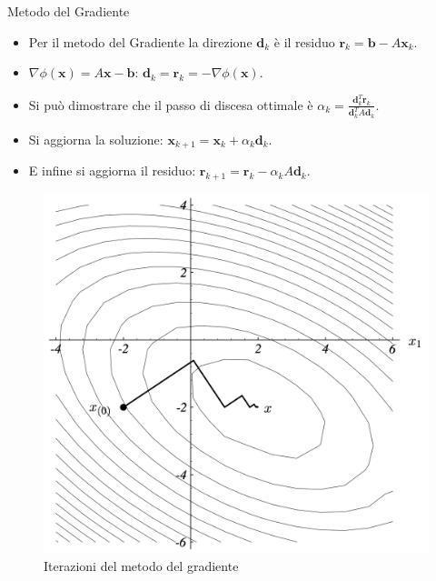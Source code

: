 \documentclass[10pt]{beamer}
\begin{document}
\begin{frame}{Metodo del Gradiente}

\begin{itemize}
    \item Per il metodo del Gradiente la direzione $\mathbf{d}_k$ è il residuo $\mathbf{r}_k =\mathbf{b}-A\mathbf{x}_k$.
    
    \item $\nabla\phi(\mathbf{x}) = A\mathbf{x} - \mathbf{b}$: $\mathbf{d}_k = \mathbf{r}_k = - \nabla\phi(\mathbf{x})$.
    
    \item Si può dimostrare che il passo di discesa ottimale è $\alpha_k=\frac{\mathbf{d}_k^T \mathbf{r}_k}{\mathbf{d}_k^T A \mathbf{d}_k}$.
    
    \item Si aggiorna la soluzione: $\mathbf{x}_{k+1}=\mathbf{x}_{k}+\alpha_k\mathbf{d}_{k}$.
    
    \item E infine si aggiorna il residuo: $\mathbf{r}_{k+1}=\mathbf{r}_{k}-\alpha_kA\mathbf{d}_{k}$.
\end{itemize}
\begin{figure}
    \centering
    \includegraphics[width=.4\linewidth]{cg_grad.png}
    \caption{Iterazioni del metodo del gradiente}
    \end{figure}    
\end{frame}
\end{document}
